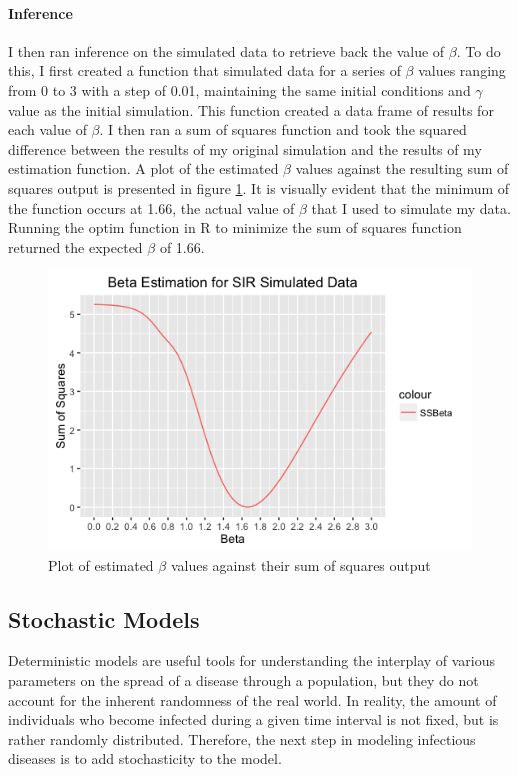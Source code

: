 \documentclass{article}
\begin{document}
\paragraph{Inference}
I then ran inference on the simulated data to retrieve back the value of $\beta$. To do this, I first created a function that simulated data for a series of $\beta$ values ranging from 0 to 3 with a step of 0.01, maintaining the same initial conditions and $\gamma$ value as the initial simulation. This function created a data frame of results for each value of $\beta$. I then ran a sum of squares function and took the squared difference between the results of my original simulation and the results of my estimation function. A plot of the estimated $\beta$ values against the resulting sum of squares output is presented in figure \ref{fig:SIRndEST}. It is visually evident that the minimum of the function occurs at 1.66, the actual value of $\beta$ that I used to simulate my data. Running the optim function in R to minimize the sum of squares function returned the expected $\beta$ of 1.66. 

\begin{figure}[h]
\includegraphics[scale=.5, outer]{BetaEstSIRnd.png}
\caption{Plot of estimated $\beta$ values against their sum of squares output}
\label{fig:SIRndEST}
\end{figure}

\subsection{Stochastic Models}
Deterministic models are useful tools for understanding the interplay of various parameters on the spread of a disease through a population, but they do not account for the inherent randomness of the real world. In reality, the amount of individuals who become infected during a given time interval is not fixed, but is rather randomly distributed. Therefore, the next step in modeling infectious diseases is to add stochasticity to the model. 
\end{document}
